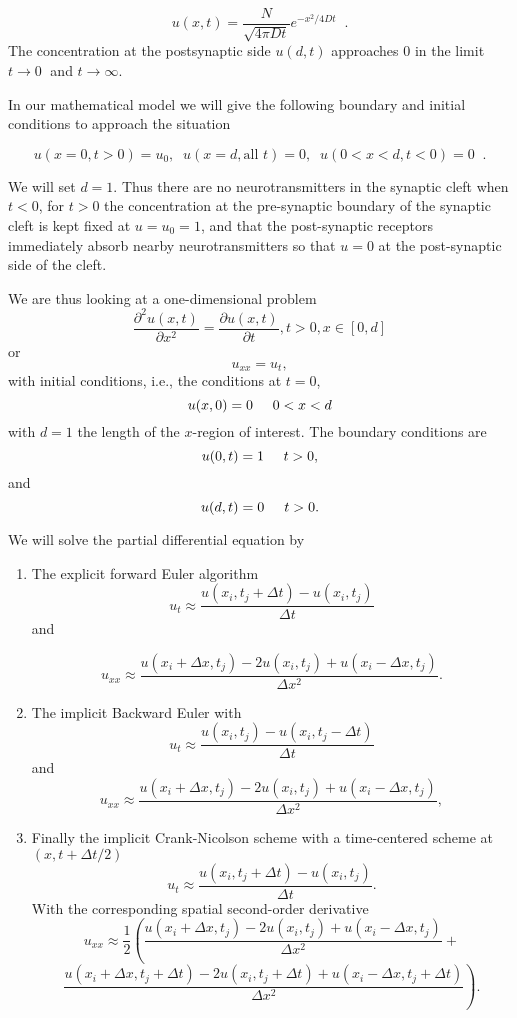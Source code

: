\documentclass[a4paper,12pt, english]{article}
\begin{document}
\begin{equation}
u(x,t) = \frac{N}{\sqrt{4 \pi D t}} e^{-x^2/4Dt}\;\;.
\label{eq:solution_delta_1D}
\end{equation}\newline
The concentration at the postsynaptic side $u(d,t)$
approaches 0 in the limit $t \rightarrow 0\;$ and
$t \rightarrow \infty$. 


In our mathematical model we will give the following boundary and initial conditions to approach the situation

\begin{equation}
u(x=0,t>0) = u_0, \;\;u(x=d,\mbox{all $t$})=0,
\;\;u(0 < x < d,t < 0) = 0 \;\;.
\label{eq:initial_conditions_2}
\end{equation}

We will set $d=1$. 
Thus there are no neurotransmitters in the synaptic cleft when $t<0$, for $t>0$ the concentration at the pre-synaptic boundary of the synaptic cleft is kept fixed at $u = u_0 = 1$, and that the post-synaptic receptors immediately absorb nearby neurotransmitters so that $u=0$ at the post-synaptic side of the cleft. 

We are thus looking at a one-dimensional problem 
\[
 \frac{\partial^2 u(x,t)}{\partial x^2} =\frac{\partial u(x,t)}{\partial t}, t> 0, x\in [0,d]
\]
or 
\[
u_{xx} = u_t,
\]
with initial conditions, i.e., the conditions at $t=0$, 
\[
u(x,0)= 0 \hspace{0.5cm} 0 < x < d
\]
with $d=1$ the length of the $x$-region of interest. The 
boundary conditions are 
\[
u(0,t)= 1 \hspace{0.5cm} t > 0,
\]
and 
\[
u(d,t)= 0 \hspace{0.5cm} t > 0.
\]

We will solve the partial differential equation by
\begin{enumerate}
\item The explicit forward Euler algorithm
 \[
u_t\approx \frac{u(x_i,t_j+\Delta t)-u(x_i,t_j)}{\Delta t}
\]
and

\[
u_{xx}\approx \frac{u(x_i+\Delta x,t_j)-2u(x_i,t_j)+u(x_i-\Delta x,t_j)}{\Delta x^2}.
\]
\item The implicit Backward Euler with
 \[
u_t\approx \frac{u(x_i,t_j)-u(x_i,t_j-\Delta t)}{\Delta t}
\]
and
\[
u_{xx}\approx \frac{u(x_i+\Delta x,t_j)-2u(x_i,t_j)+u(x_i-\Delta x,t_j)}{\Delta x^2},
\]
\item Finally the implicit Crank-Nicolson scheme with 
a time-centered scheme at $(x,t+\Delta t/2)$
 \[
u_t\approx \frac{u(x_i,t_j+\Delta t)-u(x_i,t_j)}{\Delta t}.
\]
With the corresponding spatial second-order derivative
\[
u_{xx}\approx \frac{1}{2}\left(\frac{u(x_i+\Delta x,t_j)-2u(x_i,t_j)+u(x_i-\Delta x,t_j)}{\Delta x^2}+\right.
\]
\[
\left. \frac{u(x_i+\Delta x,t_j+\Delta t)-2u(x_i,t_j+\Delta t)+u(x_i-\Delta x,t_j+\Delta t)}{\Delta x^2}
\right).
\] 

\end{enumerate}
\end{document}
